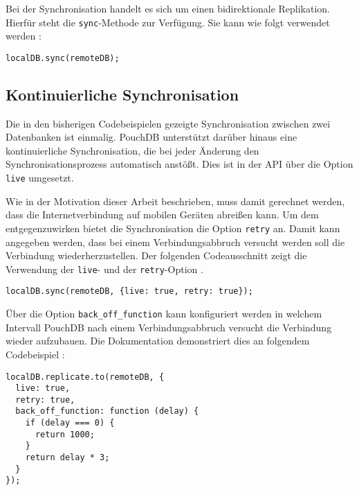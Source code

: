 Bei der Synchronisation handelt es sich um einen bidirektionale Replikation. Hierfür steht die \texttt{sync}-Methode zur Verfügung. Sie kann wie folgt verwendet werden \cite{pouch:replication}:
\begin{codebox}
\begin{lstlisting}[style=typescript]
localDB.sync(remoteDB);
\end{lstlisting}
\end{codebox}

\subsection{Kontinuierliche Synchronisation}
Die in den bisherigen Codebeispielen gezeigte Synchronisation zwischen zwei Datenbanken ist einmalig. PouchDB unterstützt darüber hinaus eine kontinuierliche Synchronisation, die bei jeder Änderung den Synchronisationsprozess automatisch anstößt. Dies ist in der API über die Option \texttt{live} umgesetzt.

Wie in der Motivation dieser Arbeit beschrieben, muss damit gerechnet werden, dass die Internetverbindung auf mobilen Geräten abreißen kann. Um dem entgegenzuwirken bietet die Synchronisation die Option \texttt{retry} an. Damit kann angegeben werden, dass bei einem Verbindungsabbruch versucht werden soll die Verbindung wiederherzustellen. Der folgenden Codeausschnitt zeigt die Verwendung der \texttt{live}- und der \texttt{retry}-Option \cite{pouch:replication}.
\begin{codebox}
\begin{lstlisting}[style=typescript]
localDB.sync(remoteDB, {live: true, retry: true});
\end{lstlisting}
\end{codebox}

Über die Option \texttt{back\_off\_function} kann konfiguriert werden in welchem Intervall PouchDB nach einem Verbindungsabbruch versucht die Verbindung wieder aufzubauen. Die Dokumentation demonstriert dies an folgendem Codebeispiel \cite{pouch:api}:

\begin{codebox}
\begin{lstlisting}[style=typescript]
localDB.replicate.to(remoteDB, {
  live: true,
  retry: true,
  back_off_function: function (delay) {
    if (delay === 0) {
      return 1000;
    }
    return delay * 3;
  }
});
\end{lstlisting}
\end{codebox}


